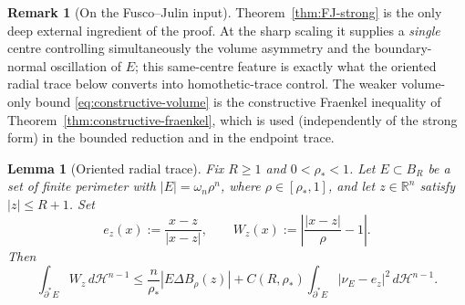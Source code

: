 \documentclass[11pt]{amsart}
\newtheorem{lemma}[theorem]{Lemma}
\theoremstyle{definition}
\newtheorem{remark}[theorem]{Remark}
\newcommand{\R}{\mathbb R}
\newcommand{\rstar}{\rho_*}
\newcommand{\Hn}{\mathcal H^{n-1}}
\begin{document}
\begin{remark}[On the Fusco--Julin input]
\label{rem:FJ-status}
Theorem~\ref{thm:FJ-strong} is the only deep external ingredient of the proof.
At the sharp scaling it supplies a \emph{single} centre controlling
simultaneously the volume asymmetry and the boundary-normal oscillation of
\(E\); this same-centre feature is exactly what the oriented radial trace below
converts into homothetic-trace control.  The weaker volume-only bound
\eqref{eq:constructive-volume} is the constructive Fraenkel inequality of
Theorem~\ref{thm:constructive-fraenkel}, which is used (independently of the
strong form) in the bounded reduction and in the endpoint trace.
\end{remark}

\begin{lemma}[Oriented radial trace]\label{lem:oriented-radial-trace}
Fix \(R\ge1\) and \(0<\rstar<1\).  Let \(E\subset B_R\) be a set of finite
perimeter with \(|E|=\omega_n\rho^n\), where \(\rho\in[\rstar,1]\), and
let \(z\in\R^n\) satisfy \(|z|\le R+1\).  Set
\[
   e_z(x):=\frac{x-z}{|x-z|},\qquad
   W_z(x):=\left|\frac{|x-z|}{\rho}-1\right|.
\]
Then
\begin{equation}\label{eq:oriented-radial-trace}
   \int_{\partial^*E} W_z\,d\Hn
   \le
   \frac{n}{\rstar}|E\Delta B_\rho(z)|
   +
   C(R,\rstar)
   \int_{\partial^*E}|\nu_E-e_z|^2\,d\Hn .
\end{equation}
\end{lemma}
\end{document}
